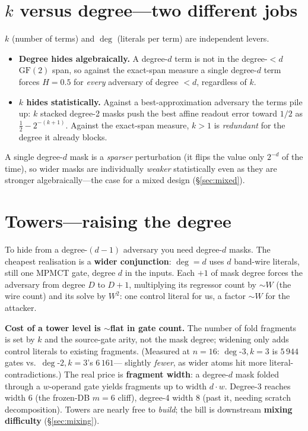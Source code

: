 \documentclass[11pt]{article}
\begin{document}
\section{$k$ versus degree---two different jobs}

$k$ (number of terms) and $\deg$ (literals per term) are independent levers.
\begin{itemize}
\item \textbf{Degree hides algebraically.} A degree-$d$ term is not in the
degree-${<}d$ $\mathrm{GF}(2)$ span, so against the exact-span measure a single
degree-$d$ term forces $H=0.5$ for \emph{every} adversary of degree $<d$,
regardless of $k$.
\item \textbf{$k$ hides statistically.} Against a best-approximation adversary
the terms pile up: $k$ stacked degree-2 masks push the best affine readout error
toward $1/2$ as $\tfrac12-2^{-(k+1)}$. Against the exact-span measure, $k>1$ is
\emph{redundant} for the degree it already blocks.
\end{itemize}
A single degree-$d$ mask is a \emph{sparser} perturbation (it flips the value
only $2^{-d}$ of the time), so wider masks are individually \emph{weaker}
statistically even as they are stronger algebraically---the case for a mixed
design (\S\ref{sec:mixed}).

\section{Towers---raising the degree}

To hide from a degree-$(d{-}1)$ adversary you need degree-$d$ masks. The cheapest
realisation is a \textbf{wider conjunction}: $\deg=d$ uses $d$ band-wire literals,
still one MPMCT gate, degree $d$ in the inputs. Each $+1$ of mask degree forces
the adversary from degree $D$ to $D{+}1$, multiplying its regressor count by
${\sim}W$ (the wire count) and its solve by $W^2$: one control literal for us, a
factor ${\sim}W$ for the attacker.

\textbf{Cost of a tower level is $\sim$flat in gate count.} The number of fold
fragments is set by $k$ and the source-gate arity, not the mask degree; widening
only adds control literals to existing fragments. (Measured at $n=16$:
$\deg\text{-}3,k=3$ is $5\,944$ gates vs.\ $\deg\text{-}2,k=3$'s $6\,161$---
slightly \emph{fewer}, as wider atoms hit more literal-contradictions.) The real
price is \textbf{fragment width}: a degree-$d$ mask folded through a $w$-operand
gate yields fragments up to width $d\cdot w$. Degree-3 reaches width 6 (the
frozen-DB $m=6$ cliff), degree-4 width 8 (past it, needing scratch
decomposition). Towers are nearly free to \emph{build}; the bill is downstream
\textbf{mixing difficulty} (\S\ref{sec:mixing}).
\end{document}
